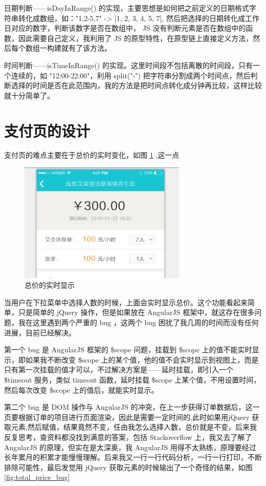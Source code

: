         \par
        日期判断——isDayInRange() 的实现，主要思想是如何把之前定义的日期格式字符串转化成数组，如："1,2-5,7" -> [1, 2, 3, 4, 5, 7], 然后把选择的日期转化成工作日对应的数字，判断该数字是否在数组中， JS 没有判断元素是否在数组中的函数，因此需要自己定义，我利用了 JS 的原型特性，在原型链上直接定义方法，然后每个数组一构建就有了该方法。
        \par
        时间判断——isTimeInRange() 的实现。这里时间段不包括离散的时间段，只有一个连续的，如 "12:00-22:00"，利用 split("-") 把字符串分割成两个时间点，然后判断选择的时间是否在此范围内，我的方法是把时间点转化成分钟再比较，这样比较就十分简单了。

\section{支付页的设计}
  \label{sec:支付页的设计}
    支付页的难点主要在于总价的实时变化，如图 \ref{fig:real_time_price} ,这一点
    \begin{figure}[H]
      \centering
      \includegraphics[width=8cm]{./img/real_time_price.png}
      \caption{总价的实时显示}
      \label{fig:real_time_price}
    \end{figure}
    当用户在下拉菜单中选择人数的时候，上面会实时显示总价。这个功能看起来简单，只是简单的 jQuery 操作，但是如果放在 AngularJS 框架中，就这存在很多问题，我在这里遇到两个严重的 bug ，这两个 bug 困扰了我几周的时间而没有任何进展，目前已经解决。
    \par
    第一个 bug 是 AngularJS 框架的 \$scope 问题，挂载到 \$scope 上的值不能实时显示，即如果我不断改变 \$scope 上的某个值，他的值不会实时显示到视图上，而是只有第一次挂载的值才可以，不过解决方案是——延时挂载，即引入一个 \$timeout 服务，类似 timeout 函数，延时挂载 \$scope 上某个值，不用设置时间，然后每次改变 \$scope 上的值后，就能实时显示。
    \par
    第二个 bug 是 DOM 操作与 AngularJS 的冲突，在上一步获得订单数据后，这一页要根据订单的项目进行页面渲染，因此是需要一定时间的,此时如果用jQuery 获取元素,然后赋值，结果竟然不变，任由我怎么选择人数，总价就是不变，后来我反复思考，查资料都没找到满意的答案，包括 Stackoverflow 上，我又去了解了 AngularJS 的原理，但实在是太深奥，我 AngularJS 用得不太熟练，原理要经过长年累月的积累才能慢慢理解。后来我又一行一行代码分析，一行一行打印，不断排除可能性，最后发觉用 jQuery 获取元素的时候输出了一个奇怪的结果，如图 \ref{fig:total_price_bug}
